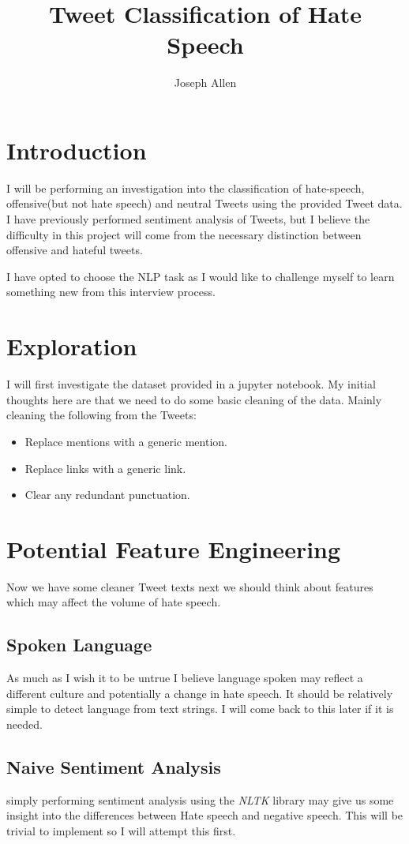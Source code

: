 \documentclass[a4paper]{article}
\title{Tweet Classification of Hate Speech}
\author{Joseph Allen}
\begin{document}
\maketitle

\section{Introduction}
I will be performing an investigation into the classification of hate-speech, offensive(but not hate speech) and neutral Tweets using the provided Tweet data. I have previously performed sentiment analysis of Tweets, but I believe the difficulty in this project will come from the necessary distinction between offensive and hateful tweets.

I have opted to choose the NLP task as I would like to challenge myself to learn something new from this interview process.

\section{Exploration}
I will first investigate the dataset provided in a jupyter notebook. My initial thoughts here are that we need to do some basic cleaning of the data. Mainly cleaning the following from the Tweets:
\begin{itemize}
\item Replace mentions with a generic mention.
\item Replace links with a generic link.
\item Clear any redundant punctuation.
\end{itemize}

\section{Potential Feature Engineering}
Now we have some cleaner Tweet texts next we should think about features which may affect the volume of hate speech. 

\subsection{Spoken Language}
As much as I wish it to be untrue I believe language spoken may reflect a different culture and potentially a change in hate speech. It should be relatively simple to detect language from text strings. I will come back to this later if it is needed.

\subsection{Naive Sentiment Analysis}
simply performing sentiment analysis using the \textit{NLTK} library may give us some insight into the differences between Hate speech and negative speech. This will be trivial to implement so I will attempt this first.
\end{document}
